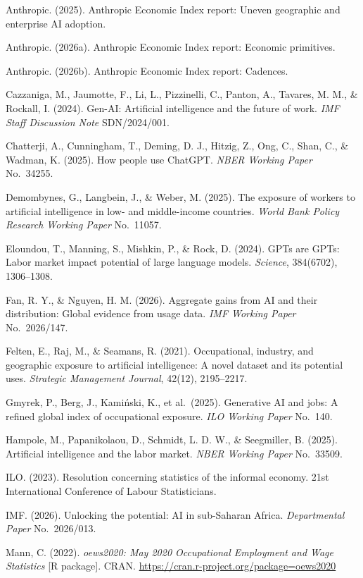 \documentclass[
  11pt,
]{article}
\begin{document}
Anthropic. (2025). Anthropic Economic Index report: Uneven geographic
and enterprise AI adoption.

Anthropic. (2026a). Anthropic Economic Index report: Economic
primitives.

Anthropic. (2026b). Anthropic Economic Index report: Cadences.

Cazzaniga, M., Jaumotte, F., Li, L., Pizzinelli, C., Panton, A.,
Tavares, M. M., \& Rockall, I. (2024). Gen-AI: Artificial intelligence
and the future of work. \emph{IMF Staff Discussion Note} SDN/2024/001.

Chatterji, A., Cunningham, T., Deming, D. J., Hitzig, Z., Ong, C., Shan,
C., \& Wadman, K. (2025). How people use ChatGPT. \emph{NBER Working
Paper} No.~34255.

Demombynes, G., Langbein, J., \& Weber, M. (2025). The exposure of
workers to artificial intelligence in low- and middle-income countries.
\emph{World Bank Policy Research Working Paper} No.~11057.

Eloundou, T., Manning, S., Mishkin, P., \& Rock, D. (2024). GPTs are
GPTs: Labor market impact potential of large language models.
\emph{Science}, 384(6702), 1306--1308.

Fan, R. Y., \& Nguyen, H. M. (2026). Aggregate gains from AI and their
distribution: Global evidence from usage data. \emph{IMF Working Paper}
No.~2026/147.

Felten, E., Raj, M., \& Seamans, R. (2021). Occupational, industry, and
geographic exposure to artificial intelligence: A novel dataset and its
potential uses. \emph{Strategic Management Journal}, 42(12), 2195--2217.

Gmyrek, P., Berg, J., Kamiński, K., et al.~(2025). Generative AI and
jobs: A refined global index of occupational exposure. \emph{ILO Working
Paper} No.~140.

Hampole, M., Papanikolaou, D., Schmidt, L. D. W., \& Seegmiller, B.
(2025). Artificial intelligence and the labor market. \emph{NBER Working
Paper} No.~33509.

ILO. (2023). Resolution concerning statistics of the informal economy.
21st International Conference of Labour Statisticians.

IMF. (2026). Unlocking the potential: AI in sub-Saharan Africa.
\emph{Departmental Paper} No.~2026/013.

Mann, C. (2022). \emph{oews2020: May 2020 Occupational Employment and
Wage Statistics} {[}R package{]}. CRAN.
\url{https://cran.r-project.org/package=oews2020}
\end{document}
